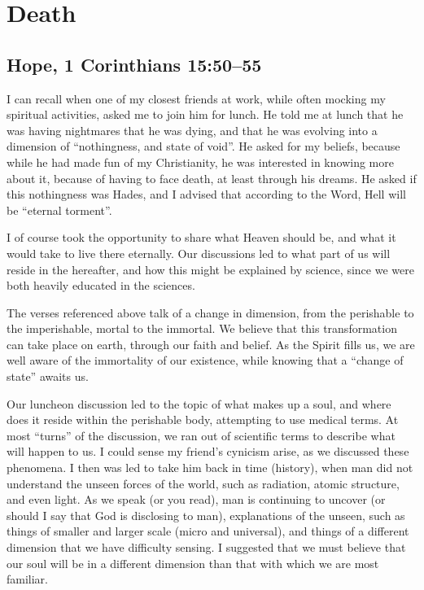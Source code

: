 \documentclass[12pt]{memoir}
\begin{document}
\section{Death}

\subsection[Hope]{Hope, 1 Corinthians 15:50--55}

I can recall when one of my closest friends at work, while often mocking
my spiritual activities, asked me to join him for lunch. He told me
at lunch that he was having nightmares that he was dying, and that
he was evolving into a dimension of ``nothingness, and state of void''.
He asked for my beliefs, because while he had made fun of my Christianity,
he was interested in knowing more about it, because of having to face
death, at least through his dreams. He asked if this nothingness was
Hades, and I advised that according to the Word, Hell will be ``eternal
torment''.

I of course took the opportunity to share what Heaven should be, and
what it would take to live there eternally. Our discussions led to
what part of us will reside in the hereafter, and how this might be
explained by science, since we were both heavily educated in the sciences.

The verses referenced above talk of a change in dimension, from the
perishable to the imperishable, mortal to the immortal. We believe
that this transformation can take place on earth, through our faith
and belief. As the Spirit fills us, we are well aware of the immortality
of our existence, while knowing that a ``change of state'' awaits
us.

Our luncheon discussion led to the topic of what makes up a soul,
and where does it reside within the perishable body, attempting to
use medical terms. At most ``turns'' of the discussion, we ran out
of scientific terms to describe what will happen to us. I could sense
my friend's cynicism arise, as we discussed these phenomena. I then
was led to take him back in time (history), when man did not understand
the unseen forces of the world, such as radiation, atomic structure,
and even light. As we speak (or you read), man is continuing to uncover
(or should I say that God is disclosing to man), explanations of the
unseen, such as things of smaller and larger scale (micro and universal),
and things of a different dimension that we have difficulty sensing.
I suggested that we must believe that our soul will be in a different
dimension than that with which we are most familiar.
\end{document}
